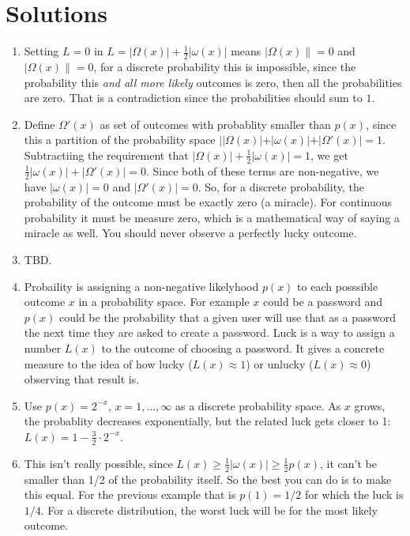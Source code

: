 \section{Solutions}


\begin{enumerate}
  \item Setting $L=0$ in $L=|\Omega(x)|+\frac{1}{2}|\omega(x)|$ means $|\Omega(x)\| = 0$ and $|\Omega(x)\| = 0$, for a discrete probability this is impossible, since the probability this {\em and all more likely} outcomes is zero, then all the probabilities are zero.  That is a contradiction since the probabilities should sum to $1$.
  \item Define $\Omega'(x)$ as set of outcomes with probablity smaller than $p(x)$, since this a partition of the probability space $||\Omega(x)|+|\omega(x)|+|\Omega'(x)|=1$.  Subtractiing the requirement that $|\Omega(x)|+\frac{1}{2}|\omega(x)|=1$, we get $\frac{1}{2}|\omega(x)|+|\Omega'(x)|=0$.  Since both of these terms are non-negative, we have $|\omega(x)|=0$ and $|\Omega'(x)|=0$.  So, for a discrete probability, the probability of the outcome must be exactly zero (a miracle). For continuous probability it must be measure zero, which is a mathematical way of saying a miracle as well. You should never observe a perfectly lucky outcome.
  \item TBD. %
  \item Probaility is assigning a non-negative likelyhood $p(x)$ to each posssible outcome $x$ in a probability space.  For example $x$ could be a password and $p(x)$ could be the probability that a given user will use that as a password the next time they are asked to create a password.  Luck is a way to assign a number $L(x)$ to the outcome of choosing a password.  It gives a concrete measure to the idea of how lucky ($L(x) \approx 1$) or unlucky ($L(x) \approx 0$) observing that result is.
  \item Use $p(x)=2^{-x}$, $x=1,\ldots,\infty$ as a discrete probability space.  As $x$ grows, the probablity decreases exponentially, but the related luck gets closer to 1: $L(x) = 1-\frac{3}{2} \cdot 2^{-x}$.
  \item This isn't really possible, since $L(x) \geq \frac{1}{2} |\omega(x)| \geq \frac{1}{2} p(x)$, it can't be smaller than 1/2 of the probability itself.  So the best you can do is to make this equal.  For the previous example that is $p(1)=1/2$ for which the luck is $1/4$.  For a discrete distribution, the worst luck will be for the most likely outcome.

\end{enumerate}
